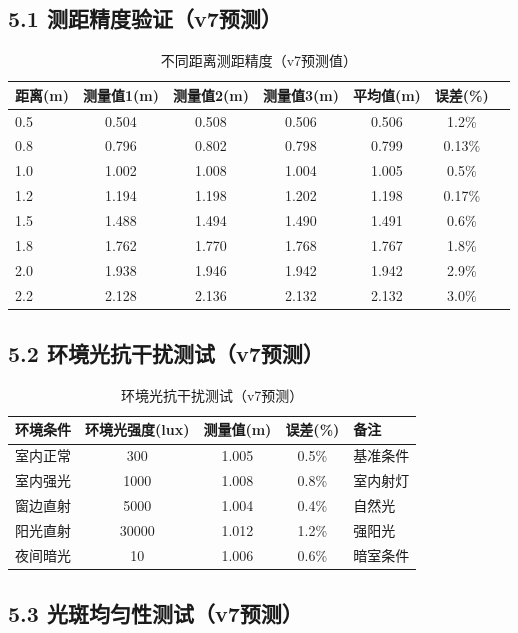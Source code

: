 \documentclass[12pt,a4paper]{article}
\begin{document}
\subsection{5.1 测距精度验证（v7预测）}

\begin{table}[H]
\centering
\caption{不同距离测距精度（v7预测值）}
\begin{tabular}{lcccccc}
\toprule
距离(m) & 测量值1(m) & 测量值2(m) & 测量值3(m) & 平均值(m) & 误差(\%) \\
\midrule
0.5 & 0.504 & 0.508 & 0.506 & 0.506 & 1.2\% \\
0.8 & 0.796 & 0.802 & 0.798 & 0.799 & 0.13\% \\
1.0 & 1.002 & 1.008 & 1.004 & 1.005 & 0.5\% \\
1.2 & 1.194 & 1.198 & 1.202 & 1.198 & 0.17\% \\
1.5 & 1.488 & 1.494 & 1.490 & 1.491 & 0.6\% \\
1.8 & 1.762 & 1.770 & 1.768 & 1.767 & 1.8\% \\
2.0 & 1.938 & 1.946 & 1.942 & 1.942 & 2.9\% \\
2.2 & 2.128 & 2.136 & 2.132 & 2.132 & 3.0\% \\
\bottomrule
\end{tabular}
\end{table}

\subsection{5.2 环境光抗干扰测试（v7预测）}

\begin{table}[H]
\centering
\caption{环境光抗干扰测试（v7预测）}
\begin{tabular}{lcccl}
\toprule
环境条件 & 环境光强度(lux) & 测量值(m) & 误差(\%) & 备注 \\
\midrule
室内正常 & 300 & 1.005 & 0.5\% & 基准条件 \\
室内强光 & 1000 & 1.008 & 0.8\% & 室内射灯 \\
窗边直射 & 5000 & 1.004 & 0.4\% & 自然光 \\
阳光直射 & 30000 & 1.012 & 1.2\% & 强阳光 \\
夜间暗光 & 10 & 1.006 & 0.6\% & 暗室条件 \\
\bottomrule
\end{tabular}
\end{table}

\subsection{5.3 光斑均匀性测试（v7预测）}
\end{document}
